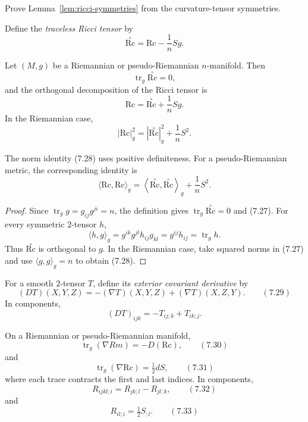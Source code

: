 \begin{exercise}
\label{exer:ricci-symmetries-proof}

Prove Lemma~\ref{lem:ricci-symmetries} from the curvature-tensor symmetries.
\end{exercise}

Define the \emph{traceless Ricci tensor} by
\[
\stackrel{\circ}{\mathrm{Rc}}
=\mathrm{Rc}-\frac1nSg.
\]

\begin{proposition}
\label{prop:ricci-tensor-decomposition}

Let $(M,g)$ be a Riemannian or pseudo-Riemannian $n$-manifold. Then
\[
\operatorname{tr}_g\stackrel{\circ}{\mathrm{Rc}}=0,
\]
and the orthogonal decomposition of the Ricci tensor is
\begin{equation}
\mathrm{Rc}=\stackrel{\circ}{\mathrm{Rc}}+\frac1nSg.
\tag{7.27}
\end{equation}
In the Riemannian case,
\begin{equation}
|\mathrm{Rc}|_g^2
=|\stackrel{\circ}{\mathrm{Rc}}|_g^2+\frac1nS^2.
\tag{7.28}
\end{equation}
\end{proposition}

\begin{remark}
The norm identity (7.28) uses positive definiteness. For a
pseudo-Riemannian metric, the corresponding identity is
\[
\langle\mathrm{Rc},\mathrm{Rc}\rangle_g
=\left\langle\stackrel{\circ}{\mathrm{Rc}},
\stackrel{\circ}{\mathrm{Rc}}\right\rangle_g+\frac1nS^2.
\]
\end{remark}

\begin{proof}
\sketch Since
$\operatorname{tr}_gg=g_{ij}g^{ji}=n$, the definition gives
$\operatorname{tr}_g\stackrel{\circ}{\mathrm{Rc}}=0$ and (7.27). For every
symmetric $2$-tensor $h$,
\[
\langle h,g\rangle_g
=g^{ik}g^{jl}h_{ij}g_{kl}
=g^{ij}h_{ij}
=\operatorname{tr}_gh.
\]
Thus $\stackrel{\circ}{\mathrm{Rc}}$ is orthogonal to $g$. In the Riemannian
case, take squared norms in (7.27) and use
$\langle g,g\rangle_g=n$ to obtain (7.28).
\end{proof}

For a smooth $2$-tensor $T$, define its \emph{exterior covariant derivative}
by
\[
(DT)(X,Y,Z)=-(\nabla T)(X,Y,Z)+(\nabla T)(X,Z,Y).
\qquad (7.29)
\]
In components,
\[
(DT)_{ijk}=-T_{ij;k}+T_{ik;j}.
\]

\begin{proposition}
\label{prop:contracted-bianchi-identities}

On a Riemannian or pseudo-Riemannian manifold,
\[
\operatorname{tr}_g(\nabla Rm)=-D(\mathrm{Rc}),
\qquad (7.30)
\]
and
\[
\operatorname{tr}_g(\nabla\mathrm{Rc})=\tfrac12dS,
\qquad (7.31)
\]
where each trace contracts the first and last indices. In components,
\[
R_{ijkl;i}=R_{jk;l}-R_{jl;k},
\qquad (7.32)
\]
and
\[
R_{il;i}=\tfrac12S_{;l}.
\qquad (7.33)
\]
\end{proposition}

